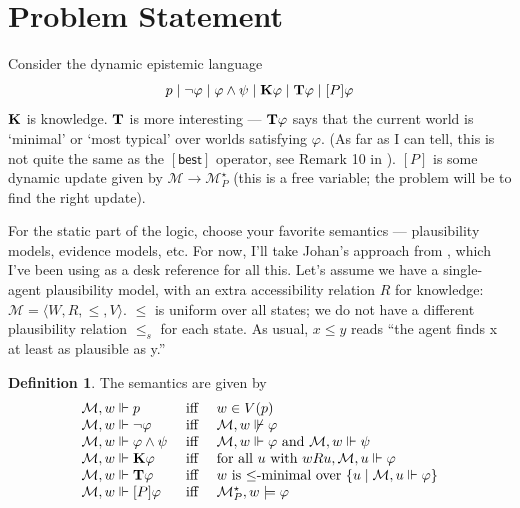 \documentclass[letterpaper]{article}
\theoremstyle{definition}
\newtheorem{definition}{Definition}
\newcommand{\Model}{\mathcal{M}}
\newcommand{\set}[1]{\{ #1 \}}
\newcommand{\Typ}[1]{\textrm{\textup{\textbf{T}}} #1}
\newcommand{\Know}[1]{\textrm{\textup{\textbf{K}}} #1}
\newcommand{\KnowNoArgs}{\textrm{\textup{\textbf{K}}}}
\newcommand{\TypNoArgs}{\textrm{\textup{\textbf{T}}}}
\newcommand{\Update}[1]{[#1]}
\newcommand{\BestNoArgs}{[\mathsf{best}]}
\begin{document}
\section*{Problem Statement}

Consider the dynamic epistemic language
\[
    p \mid \neg \varphi \mid \varphi \land \psi \mid \Know{\varphi} \mid \Typ{\varphi} \mid \Update{P} \varphi
\]
$\KnowNoArgs$ is knowledge.  $\TypNoArgs$ is more interesting --- $\Typ{\varphi}$ says that the current world is `minimal' or `most typical' over worlds satisfying $\varphi$.  (As far as I can tell, this is not quite the same as the $\BestNoArgs$ operator, see Remark 10 in \cite{van2007beliefrevision}).  $\Update{P}$ is some dynamic update given by $\Model \to \Model^\star_P$ (this is a free variable; the problem will be to find the right update).

For the static part of the logic, choose your favorite semantics --- plausibility models, evidence models, etc.  For now, I'll take Johan's approach from \cite{van2011logical}, which I've been using as a desk reference for all this.  Let's assume we have a single-agent plausibility model, with an extra accessibility relation $R$ for knowledge: $\Model = \langle W, R, \leq, V \rangle$.  $\leq$ is uniform over all states; we do not have a different plausibility relation $\leq_s$ for each state.  As usual, $x \leq y$ reads ``the agent finds x at least as plausible as y.''

\begin{definition}
    The semantics are given by
    \[
    \begin{array}{lcl}
        \Model, w \Vdash p & \mbox{ iff } & w \in V(p)\\
        \Model, w \Vdash \neg \varphi & \mbox{ iff } & \Model, w \not \Vdash \varphi\\
        \Model, w \Vdash \varphi \land \psi & \mbox{ iff } & \Model, w \Vdash \varphi \mbox{ and } \Model, w \Vdash \psi\\
        \Model, w \Vdash \Know \varphi & \mbox{ iff } & \mbox{for all } u \mbox{ with } w{R}u, \Model, u \Vdash \varphi \\
        \Model, w \Vdash \Typ{\varphi} & \mbox{ iff } & w \mbox{ is } {\leq}\mbox{-minimal over } \set{u \mid \Model, u \Vdash \varphi} \\
        \Model, w \Vdash \Update{P} \varphi & \mbox{ iff } & \Model^\star_P, w \models \varphi
    \end{array}
    \]
\end{definition}
\end{document}
